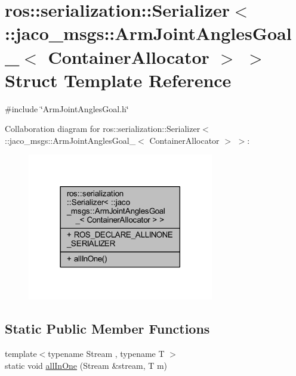 \hypertarget{structros_1_1serialization_1_1Serializer_3_01_1_1jaco__msgs_1_1ArmJointAnglesGoal___3_01ContainerAllocator_01_4_01_4}{}\section{ros\+:\+:serialization\+:\+:Serializer$<$ \+:\+:jaco\+\_\+msgs\+:\+:Arm\+Joint\+Angles\+Goal\+\_\+$<$ Container\+Allocator $>$ $>$ Struct Template Reference}
\label{structros_1_1serialization_1_1Serializer_3_01_1_1jaco__msgs_1_1ArmJointAnglesGoal___3_01ContainerAllocator_01_4_01_4}


{\ttfamily \#include \char`\"{}Arm\+Joint\+Angles\+Goal.\+h\char`\"{}}



Collaboration diagram for ros\+:\+:serialization\+:\+:Serializer$<$ \+:\+:jaco\+\_\+msgs\+:\+:Arm\+Joint\+Angles\+Goal\+\_\+$<$ Container\+Allocator $>$ $>$\+:
\nopagebreak
\begin{figure}[H]
\begin{center}
\leavevmode
\includegraphics[width=230pt]{d5/d06/structros_1_1serialization_1_1Serializer_3_01_1_1jaco__msgs_1_1ArmJointAnglesGoal___3_01Containee9c1e1091b913d72f06ffbf74fb8abf8}
\end{center}
\end{figure}
\subsection*{Static Public Member Functions}
\begin{DoxyCompactItemize}
\item 
{\footnotesize template$<$typename Stream , typename T $>$ }\\static void \hyperlink{structros_1_1serialization_1_1Serializer_3_01_1_1jaco__msgs_1_1ArmJointAnglesGoal___3_01ContainerAllocator_01_4_01_4_afc84a6c0a44a5ad1fd9af2c8a9b5b455}{all\+In\+One} (Stream \&stream, T m)
\end{DoxyCompactItemize}
